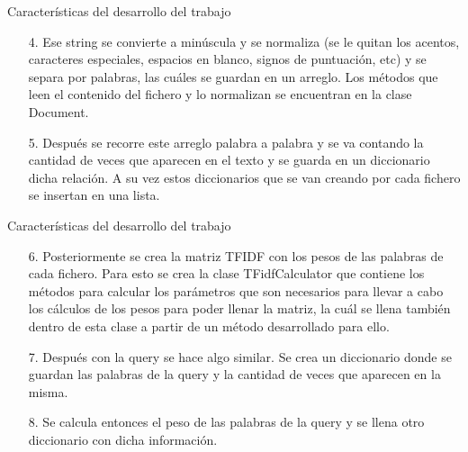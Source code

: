 \documentclass[11pt]{beamer}
\begin{document}
	\begin{frame}{Características del desarrollo del trabajo}
		
		\begin{enumerate}
			\item[4.] Ese string se convierte a minúscula y se normaliza (se le quitan los acentos, caracteres especiales, espacios en blanco, signos de puntuación, etc) y se separa por palabras, las cuáles se guardan en un arreglo.
			Los métodos que leen el contenido del fichero y lo normalizan se encuentran en la clase Document.
			
			\item[5.] Después se recorre este arreglo palabra a palabra y se va contando la cantidad de veces que aparecen en el texto y se guarda en un diccionario dicha relación.
			A su vez estos diccionarios que se van creando por cada fichero se insertan en una lista.
		\end{enumerate}
	\end{frame}
	
	\begin{frame}{Características del desarrollo del trabajo}
		\begin{enumerate}
			
			\item[6.] Posteriormente se crea la matriz TFIDF con los pesos de las palabras de cada fichero. 
			Para esto se crea la clase TFidfCalculator que contiene los métodos para calcular los parámetros que son necesarios para llevar a cabo los cálculos de los pesos para poder llenar la matriz, la cuál se llena también dentro de esta clase a partir de un método desarrollado para ello.
			
			\item[7.] Después con la query se hace algo similar.
			Se crea un diccionario donde se guardan las palabras de la query y la cantidad de veces que aparecen en la misma.
			
			\item[8.] Se calcula entonces el peso de las palabras de la query y se llena otro diccionario con dicha información.
			
		\end{enumerate}
	\end{frame}
	
\end{document}
